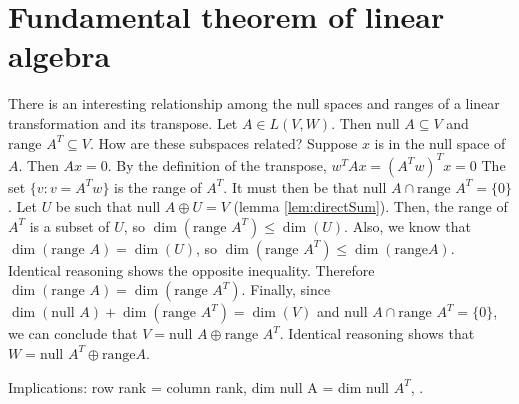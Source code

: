 \section{Fundamental theorem of linear algebra}

There is an interesting relationship among the null spaces and ranges
of a linear transformation and its transpose. Let $A \in L(V,W)$. Then
$\text{null }A \subseteq V$ and $\text{range }A^T \subseteq V$. How
are these subspaces related?  Suppose $x$ is in the null space of
$A$. Then $A x = 0$. By the definition of the transpose, $ w^T A x =
(A^T w)^T x = 0$ The set $\{v : v = A^T w\}$ is the range of $A^T$. It
must then be that $\text{null }A \cap \text{range }A^T = \{ 0 \}$. Let
$U$ be such that $\text{null }A \oplus U = V$ (lemma
\ref{lem:directSum}). Then, the range of $A^T$ is a subset of $U$, so
$\dim (\text{range }A^T) \leq \dim(U)$. Also, we know that
$\dim(\text{range }A ) = \dim(U)$, so $\dim (\text{range }A^T) \leq \dim (\text{range
}A)$.  Identical reasoning shows the opposite inequality. Therefore
$\dim(\text{range }A) = \dim(\text{range }A^T)$. Finally, since
$\dim(\text{null }A) + \dim(\text{range }A^T) = \dim(V)$ and 
$\text{null }A \cap \text{range }A^T = \{ 0 \}$, we can conclude that
$V = \text{null }A \oplus \text{range }A^T$. 
Identical reasoning shows that $W = \text{null }A^T \oplus \text{range
}A$. 

Implications: row rank = column rank, dim null A = dim null $A^T$, 
\cite{strang1993}.








